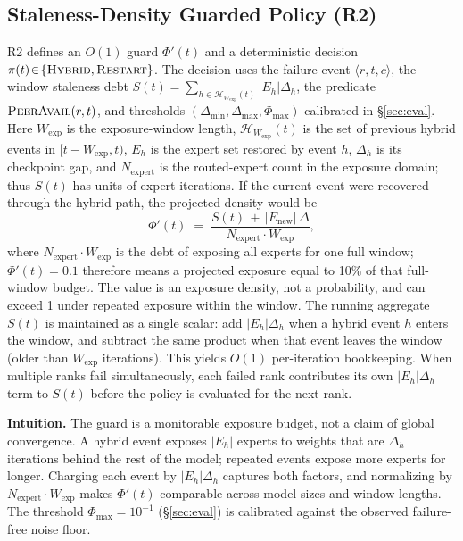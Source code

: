 \documentclass[10pt,conference]{IEEEtran}
\begin{document}
\subsection{Staleness-Density Guarded Policy (R2)}
\label{sec:policy}

R2 defines an $O(1)$ guard $\Phi'(t)$ and a deterministic decision $\pi(t)\!\in\!\{\textsc{Hybrid},\textsc{Restart}\}$. The decision uses the failure event $\langle r,t,c\rangle$, the window staleness debt $S(t)=\sum_{h\in\mathcal{H}_{W_{\mathrm{exp}}}(t)}|E_h|\Delta_h$, the predicate $\textsc{PeerAvail}(r,t)$, and thresholds $(\Delta_{\min},\Delta_{\max},\Phi_{\max})$ calibrated in \S\ref{sec:eval}. Here $W_{\mathrm{exp}}$ is the exposure-window length, $\mathcal{H}_{W_{\mathrm{exp}}}(t)$ is the set of previous hybrid events in $[t\!-\!W_{\mathrm{exp}},t)$, $E_h$ is the expert set restored by event $h$, $\Delta_h$ is its checkpoint gap, and $N_{\text{expert}}$ is the routed-expert count in the exposure domain; thus $S(t)$ has units of expert-iterations. If the current event were recovered through the hybrid path, the projected density would be
\begin{equation}
    \label{eq:phi-prime}
    \Phi'(t) \;=\; \frac{S(t) \,+\, |E_{\text{new}}|\, \Delta}{N_{\text{expert}}\cdot W_{\mathrm{exp}}},
\end{equation}
where $N_{\text{expert}}\!\cdot\!W_{\mathrm{exp}}$ is the debt of exposing all experts for one full window; $\Phi'(t)=0.1$ therefore means a projected exposure equal to 10\% of that full-window budget. The value is an exposure density, not a probability, and can exceed 1 under repeated exposure within the window. The running aggregate $S(t)$ is maintained as a single scalar: add $|E_h|\Delta_h$ when a hybrid event $h$ enters the window, and subtract the same product when that event leaves the window (older than $W_{\mathrm{exp}}$ iterations). This yields $O(1)$ per-iteration bookkeeping. When multiple ranks fail simultaneously, each failed rank contributes its own $|E_h|\Delta_h$ term to $S(t)$ before the policy is evaluated for the next rank.

\textbf{Intuition.} The guard is a monitorable exposure budget, not a claim of global convergence. A hybrid event exposes $|E_h|$ experts to weights that are $\Delta_h$ iterations behind the rest of the model; repeated events expose more experts for longer. Charging each event by $|E_h|\Delta_h$ captures both factors, and normalizing by $N_{\text{expert}}\!\cdot\!W_{\mathrm{exp}}$ makes $\Phi'(t)$ comparable across model sizes and window lengths. The threshold $\Phi_{\max}\!=\!10^{-1}$ (\S\ref{sec:eval}) is calibrated against the observed failure-free noise floor.
\end{document}

